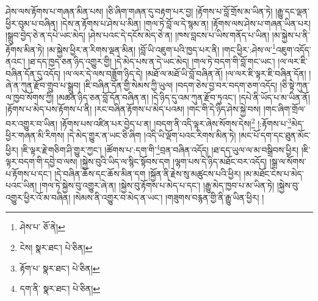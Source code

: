 ཤེས་ལས་རྟོགས་པ་གཞན་མིན་པས། །ཅི་ཞིག་གཞན་དུ་བརྟག་པར་བྱ། །རྟོགས་པ་བློ་གྲོས་མ་ཡིན་ཏེ། །རྒྱུ་དང་ལྡན་ཕྱིར་བུམ་པ་བཞིན། །དེས་ན་རྟོགས་པ་ཤེས་པ་མིན། །གལ་ཏེ་བློ་ལ་དེ་སྙམ་ན། །རྟོགས་ལས་ཤེས་པ་གཞན་ཡིན་པར། །སྒྲུབ་བྱེད་ཅེ་ན་དཔེ་ཡང་མེད། །ཤེས་པའང་དེ་དངོས་མེད་ཅེ་ན། །ཁས་བླངས་པ་ཡིས་གནོད་པ་ཡིན། །མ་སྐྱེས་པ་ནི་རྟོགས་མིན་ཏེ། །མ་སྐྱེས་ཕྱིར་ན་རིགས་ལྡན་མིན། །བློ་ཡི་འཇུག་པའི་ཁྱད་པར་ནི། །གང་ཕྱིར་:ཤེས་ལ་\footnote{ཤེས་པ་  ཅོ་ནེ། }འཇུག་འདོད་ནའང་། །ཐ་དད་ཁྱད་ཅན་ཉིད་འགྱུར་གྱི། །དེ་མེད་པས་ན་དེ་ཡང་མེད། །གལ་ཏེ་བདག་གི་བློ་གང་ཡང་། །ལ་ལར་ཇི་བཞིན་དོན་དུ་འདོད། །ལ་ལར་དེ་ལས་བཟློག་ཉིད་དེ། །མཐོ་ལ་མཐོ་ཡི་བློ་བཞིན་ནོ། །ལ་ལར་ཇི་ལྟར་ཇི་བཞིན་དོན། །ཞེ་ན་ཀུན་རྫོབ་གྲུབ་པ་སྒྲུབ། །ཇི་བཞིན་དོན་གྱི་སེམས་ཀྱི་ཡུལ། །བདག་ཅེས་བྱ་བར་བདག་ཅག་འདོད། །ཅི་སྟེ་ཀུན་ལ་ཁྱབ་སོགས་ཀྱི། །མཚན་ཉིད་ཅན་བློ་དོན་བཞིན་ན། །དེ་ཉིད་དུ་འམ་ཀུན་རྫོབ་ཏུའང་། །དཔེ་ནི་ཡོད་པ་མ་ཡིན་ནོ། །རྟོགས་པ་མེད་པས་རྟོགས་པ་ནི། །རང་བཞིན་རྟོགས་པ་མེད་པའམ། །གང་གི་དེ་ཉིད་ཤེས་སྐྱེ་བས། །གང་ཞིག་གྲོལ་བར་འགྱུར་བ་ཡིན། །རྟོགས་པས་འཛིན་པར་བྱེད་པ་ན། །བདག་ནི་འདི་ལྟར་ཞེས་སོགས་དེས།\footnote{ངེས།  སྣར་ཐང་།  པེ་ཅིན། } །:རྟོགས་པ་\footnote{རྟོག་པ་  སྣར་ཐང་།  པེ་ཅིན། }མེད་ཕྱིར་གཞན་མི་རིགས། །དེ་མེད་གྱུར་ན་ཡང་ཅི་ཞིག །འདི་ཡི་ལྡོག་པའང་རིགས་མིན་ཏེ། །མང་པོ་དག་དང་ཐུན་མོང་ཕྱིར། །ཇི་ལྟར་རྗེ་གཅིག་ཤི་གྱུར་ཀྱང་། །ཚོགས་པ་:དག་གི་\footnote{དག་ནི་  སྣར་ཐང་།  པེ་ཅིན། }བྲན་བཞིན་འདོད། །ཐ་དད་ཡུལ་ལ་མ་བསྒྲིབས་ཕྱིར། །ཇི་ལྟར་བདག་གི་དབྱེ་བ་ལས། །སྐྱེས་བུའི་ཡིད་ལ་སྙིང་སྟོབས་དག །ལྷག་པས་དེ་ཉིད་མཐོང་བར་འདོད། །སྒྲ་ལ་སོགས་པ་རྟོགས་པ་དང་། །དེ་བཞིན་ཆོས་དང་ཆོས་མིན་དག །སྐྱོན་ནི་རྗེས་སུ་མཚུངས་པའི་ཕྱིར། །མ་མཐོང་ངེས་པ་མེད་པའང་ཡིན། །གལ་ཏེ་སྐྱེས་བུ་འགྱུར་ཞེ་ན། །སྐྱེས་བུ་རྟོགས་པ་མེད་པ་དང་། །རྒྱུ་མེད་ཁྱབ་པ་མ་ཡིན་ཏེ། །སྐྱེས་བུ་འགྱུར་ཕྱིར་འོ་མ་བཞིན། །སེམས་ནི་འགྱུར་བ་མེད་ན་ཡང་། །གཟུགས་བརྙན་གྱི་ནི་རྒྱུ་ཡིན་ཕྱིར། །
